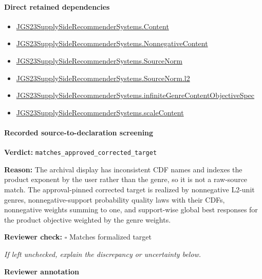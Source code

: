 \documentclass[10pt]{article}
\newcommand{\reviewerbox}{%
  \par\noindent\fbox{\parbox{0.96\linewidth}{\rule{0pt}{0.38in}}}\par
}
\newcommand{\reviewmatch}[1]{%
  \par\noindent\textbf{Reviewer check:} $\square$\; #1\par
  \noindent\emph{If left unchecked, explain the discrepancy or uncertainty below.}\par
}
\begin{document}
\paragraph{Direct retained dependencies}
\begin{itemize}\raggedright
\item \hyperlink{governing-declaration-367305fda50f0ada}{JGS23\allowbreak{}Supply\allowbreak{}Side\allowbreak{}Recommender\allowbreak{}Systems.\allowbreak{}Content}
\item \hyperlink{governing-declaration-d426babe40b9593c}{JGS23\allowbreak{}Supply\allowbreak{}Side\allowbreak{}Recommender\allowbreak{}Systems.\allowbreak{}Nonnegative\allowbreak{}Content}
\item \hyperlink{governing-declaration-6141339a5d3412d9}{JGS23\allowbreak{}Supply\allowbreak{}Side\allowbreak{}Recommender\allowbreak{}Systems.\allowbreak{}Source\allowbreak{}Norm}
\item \hyperlink{governing-declaration-9299663ffe3ecb38}{JGS23\allowbreak{}Supply\allowbreak{}Side\allowbreak{}Recommender\allowbreak{}Systems.\allowbreak{}Source\allowbreak{}Norm.\allowbreak{}l2}
\item \hyperlink{governing-declaration-013f58f28eea44cb}{JGS23\allowbreak{}Supply\allowbreak{}Side\allowbreak{}Recommender\allowbreak{}Systems.\allowbreak{}infinite\allowbreak{}Genre\allowbreak{}Content\allowbreak{}Objective\allowbreak{}Spec}
\item \hyperlink{governing-declaration-c0824fcccb145634}{JGS23\allowbreak{}Supply\allowbreak{}Side\allowbreak{}Recommender\allowbreak{}Systems.\allowbreak{}scale\allowbreak{}Content}
\end{itemize}
\paragraph{Recorded source-to-declaration screening}
\textbf{Verdict:} \texttt{matches\_approved\_corrected\_target}
\\
{\raggedright
\textbf{Reason:} The archival display has inconsistent CDF names and indexes the product exponent by the user rather than the genre, so it is not a raw-\allowbreak{}source match.\allowbreak{} The approval-\allowbreak{}pinned corrected target is realized by nonnegative L2-\allowbreak{}unit genres, nonnegative-\allowbreak{}support probability quality laws with their CDFs, nonnegative weights summing to one, and support-\allowbreak{}wise global best responses for the product objective weighted by the genre weights.\allowbreak{}
\par}
\reviewmatch{Matches formalized target}
\noindent\textbf{Reviewer annotation}\par
\reviewerbox
\clearpage
\hypertarget{paper-prerequisite-3cb4f88465048830}{}
\end{document}
